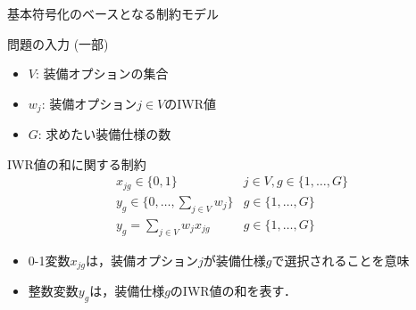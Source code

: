 \documentclass[dvipdfmx, 11pt,]{beamer}
\begin{document}
\begin{frame}{基本符号化のベースとなる制約モデル}
  \begin{block}{問題の入力 (一部)}
    \begin{itemize}\compress
     \item $V$: 装備オプションの集合
     \item $w_{j}$: 装備オプション$j\in V$のIWR値
     \item $G$: 求めたい装備仕様の数
    \end{itemize}
  \end{block}

  \begin{block}{IWR値の和に関する制約}
  \[
    \begin{array}{lr}
      x_{jg}\in\{0,1\} & j\in V, g\in\{1,\ldots,G\} \\
      y_{g}\in\{0,\ldots, \displaystyle\sum_{j\in V}w_{j}\} & g\in\{1,\ldots,G\} \\
      y_{g} = \displaystyle\sum_{j\in V}w_{j}x_{jg} & g\in\{1,\ldots,G\}
    \end{array}
  \]
  \end{block}

  \begin{itemize}\small
  \item 0-1変数$x_{jg}$は，装備オプション$j$が装備仕様$g$で選択されることを意味
  \item 整数変数$y_{g}$は，装備仕様$g$のIWR値の和を表す．
  \end{itemize}
\end{frame}
\end{document}
